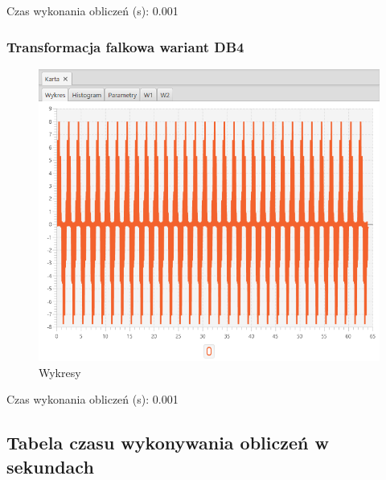 \documentclass[12pt]{article}
\begin{document}
{{{                Czas wykonania obliczeń (s): 0.001
            }
            \newpage

            \subsubsection{Transformacja falkowa wariant DB4} {

                \begin{figure}[H]
                    \centering
                    \includegraphics[width=\textwidth]{img/result/s3/08/data_draw_8_sinus_sampling_trans_s3_data_210006.png}
                    \caption{Wykresy}
                \end{figure}

                Czas wykonania obliczeń (s): 0.001
            }
            \newpage

        }
        \newpage

        \subsection{Tabela czasu wykonywania obliczeń w sekundach} {

}}
\end{document}
